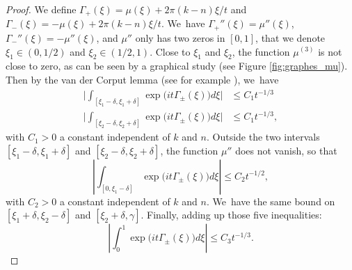 \documentclass[10pt]{amsart}
\theoremstyle{definition}
\let\EE\exp
\newcommand{\abs}[1]{\left|#1\right|}
\newcommand{\bbabs}[1]{\biggl|#1\biggr|}
\begin{document}
\begin{proof}
We define $\Gamma_+(\xi) = \mu(\xi) + {2\pi}(k-n)\xi/t$ and $\Gamma_-(\xi) = -\mu(\xi) + {2\pi}(k-n)\xi/t$. We~have $\Gamma_+''(\xi) = \mu''(\xi)$, $\Gamma_-''(\xi) = -\mu''(\xi)$, and $\mu''$ only has two zeros in $[0,1]$, that we denote $\xi_1 \in (0,1/2)$ and $\xi_2\in(1/2,1)$. Close to $\xi_1$ and $\xi_2$, the function $\mu^{(3)}$ is not close to zero, as can be seen by a graphical study (see Figure \ref{fig:graphes_mu}). Then by the van der Corput lemma (see for example \cite{Stein}), we~have
\begin{align*}
\bbabs{ \int_{[\xi_1-\delta, \xi_1+\delta]} \EE\bigl({it\Gamma_\pm(\xi)}\bigr)d\xi } &\leq {C_1}{t^{-1/3}}\\
\tag*{and}
\bbabs{ \int_{[\xi_2-\delta, \xi_2+\delta]} \EE\bigl({it\Gamma_\pm(\xi)}\bigr)d\xi } &\leq {C_1}{t^{-1/3}}, 
\end{align*}
with $C_1 > 0$ a constant independent of $k$ and $n$. Outside the two intervals \hbox{$[\xi_1-\delta, \xi_1+\delta]$} and $[\xi_2-\delta, \xi_2+\delta]$, the function $\mu''$ does not vanish, so that
\[
\abs{ \int_{[0, \xi_1-\delta]} \EE\bigl({it\Gamma_\pm(\xi)}\bigr)d\xi } \leq {C_2}{t^{-1/2}}, 
\]
with $C_2 > 0$ a constant independent of $k$ and $n$. We~have the same bound on \hbox{$[\xi_1+\delta, \xi_2-\delta]$} and $[\xi_2+\delta, \gamma]$. Finally, adding up those five inequalities:
\begin{equation}\label{estimation2}
\abs{ \int_{0}^1 \EE\bigl({it\Gamma_\pm(\xi)}\bigr)d\xi } \leq {C_3}{t^{-1/3}}.
\end{equation}


\end{proof}
\end{document}
